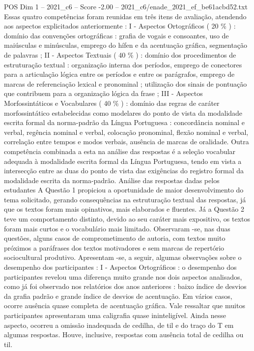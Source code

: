 \begin{textsample}{POS Dim 1 – 2021\_c6 – Score -2.00 – 2021\_c6/enade\_2021\_ef\_be61acbd52.txt}
Essas quatro competências foram reunidas em três itens de avaliação, atendendo aos aspectos explicitados anteriormente : I - Aspectos Ortográficos ( 20 \% ) : domínio das convenções ortográficas : grafia de vogais e consoantes, uso de maiúsculas e minúsculas, emprego do hífen e da acentuação gráfica, segmentação de palavras ; II - Aspectos Textuais ( 40 \% ) : domínio dos procedimentos de estruturação textual : organização interna dos períodos, emprego de conectores para a articulação lógica entre os períodos e entre os parágrafos, emprego de marcas de referenciação lexical e pronominal ; utilização dos sinais de pontuação que contribuem para a organização lógica da frase ; III - Aspectos Morfossintáticos e Vocabulares ( 40 \% ) : domínio das regras de caráter morfossintático estabelecidas como modelares do ponto de vista da modalidade escrita formal da norma-padrão da Língua Portuguesa : concordância nominal e verbal, regência nominal e verbal, colocação pronominal, flexão nominal e verbal, correlação entre tempos e modos verbais, ausência de marcas de oralidade.
Outra competência combinada a esta na análise das respostas é a seleção vocabular adequada à modalidade escrita formal da Língua Portuguesa, tendo em vista a intersecção entre as duas do ponto de vista das exigências do registro formal da modalidade escrita da norma-padrão.
Análise das respostas dadas pelos estudantes A Questão 1 propiciou a oportunidade de maior desenvolvimento do tema solicitado, gerando consequências na estruturação textual das respostas, já que os textos foram mais opinativos, mais elaborados e fluentes.
Já a Questão 2 teve um comportamento distinto, devido ao seu caráter mais expositivo, os textos foram mais curtos e o vocabulário mais limitado.
Observaram -se, nas duas questões, alguns casos de comprometimento de autoria, com textos muito próximos a paráfrases dos textos motivadores e sem marcas de repertório sociocultural produtivo.
Apresentam -se, a seguir, algumas observações sobre o desempenho dos participantes : I - Aspectos Ortográficos : o desempenho dos participantes revelou uma diferença muito grande nos dois aspectos analisados, como já foi observado nos relatórios dos anos anteriores : baixo índice de desvios da grafia padrão e grande índice de desvios de acentuação.
Em vários casos, ocorre ausência quase completa de acentuação gráfica.
Vale ressaltar que muitos participantes apresentaram uma caligrafia quase ininteligível.
Ainda nesse aspecto, ocorreu a omissão inadequada de cedilha, de til e do traço do T em algumas respostas.
Houve, inclusive, respostas com ausência total de cedilha ou til.

\end{textsample}
